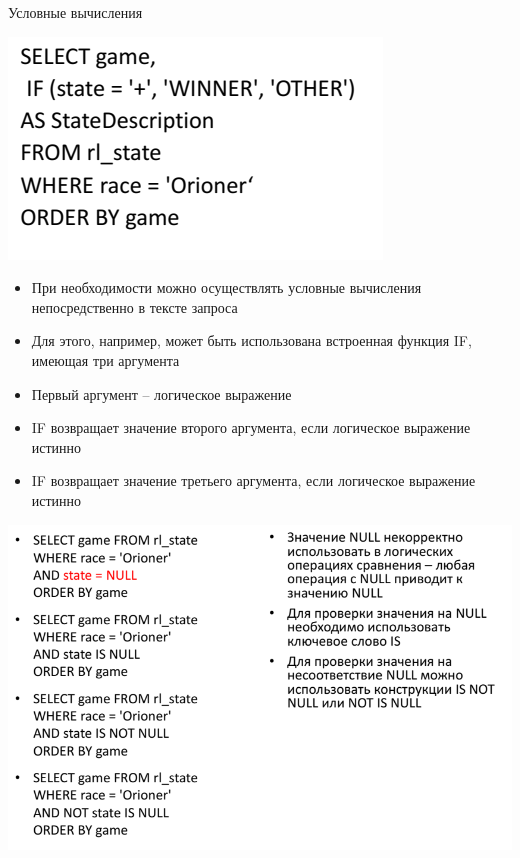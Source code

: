 \documentclass{beamer}
\begin{document}
\begin{frame}{Условные вычисления}
\begin{minipage}{0.4\textwidth}
  \begin{flushleft}	
  	\begin{center}
		\includegraphics[scale=0.5]{images/sql-05.png}
	\end{center}
  \end{flushleft}  	
\end{minipage}
\begin{minipage}{0.5\textwidth}
  \begin{flushright}
	\begin{itemize}
	\item При необходимости можно осуществлять условные вычисления непосредственно в тексте запроса
	\item Для этого, например, может быть использована встроенная функция IF, имеющая три аргумента
	\item Первый аргумент – логическое выражение 
	\item IF возвращает значение второго аргумента, если логическое выражение истинно
	\item IF возвращает значение третьего аргумента, если логическое выражение истинно
	\end{itemize}
  \end{flushright}
\end{minipage}
\end{frame}

\begin{frame}
\begin{center}
\includegraphics[scale=0.5]{images/sql-06.png}
\end{center}
\end{frame} 
\end{document}
